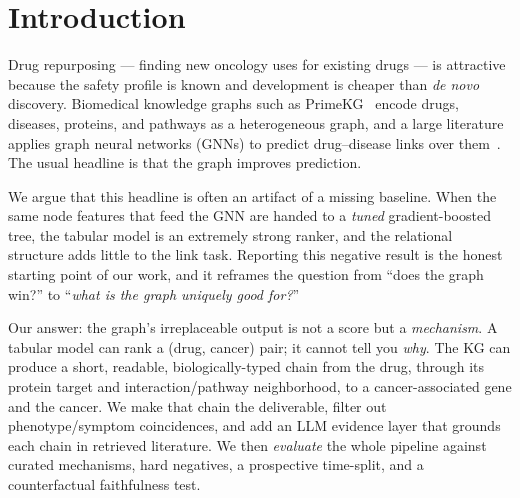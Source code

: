 \documentclass[11pt]{article}
\begin{document}
\section{Introduction}
Drug repurposing --- finding new oncology uses for existing drugs --- is attractive because
the safety profile is known and development is cheaper than \emph{de novo} discovery.
Biomedical knowledge graphs such as PrimeKG~\cite{primekg} encode drugs, diseases, proteins,
and pathways as a heterogeneous graph, and a large literature applies graph neural networks
(GNNs) to predict drug--disease links over them~\cite{txgnn,decagon}. The usual headline is
that the graph improves prediction.

We argue that this headline is often an artifact of a missing baseline. When the same node
features that feed the GNN are handed to a \emph{tuned} gradient-boosted tree, the tabular
model is an extremely strong ranker, and the relational structure adds little to the link
task. Reporting this negative result is the honest starting point of our work, and it
reframes the question from ``does the graph win?'' to ``\emph{what is the graph uniquely
good for?}''

Our answer: the graph's irreplaceable output is not a score but a \emph{mechanism}. A
tabular model can rank a (drug, cancer) pair; it cannot tell you \emph{why}. The KG can
produce a short, readable, biologically-typed chain from the drug, through its protein
target and interaction/pathway neighborhood, to a cancer-associated gene and the cancer.
We make that chain the deliverable, filter out phenotype/symptom coincidences, and add an
LLM evidence layer that grounds each chain in retrieved literature. We then \emph{evaluate}
the whole pipeline against curated mechanisms, hard negatives, a prospective time-split, and
a counterfactual faithfulness test.
\end{document}
